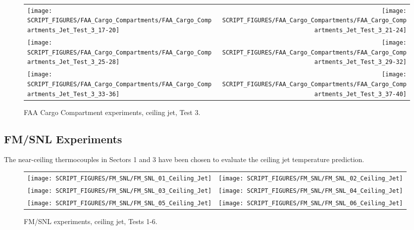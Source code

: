 \begin{figure}[p]
\begin{tabular*}{\textwidth}{l@{\extracolsep{\fill}}r}
\texttt{[image: SCRIPT\_FIGURES/FAA\_Cargo\_Compartments/FAA\_Cargo\_Compartments\_Jet\_Test\_3\_17-20]} &
\texttt{[image: SCRIPT\_FIGURES/FAA\_Cargo\_Compartments/FAA\_Cargo\_Compartments\_Jet\_Test\_3\_21-24]} \\
\texttt{[image: SCRIPT\_FIGURES/FAA\_Cargo\_Compartments/FAA\_Cargo\_Compartments\_Jet\_Test\_3\_25-28]} &
\texttt{[image: SCRIPT\_FIGURES/FAA\_Cargo\_Compartments/FAA\_Cargo\_Compartments\_Jet\_Test\_3\_29-32]} \\
\texttt{[image: SCRIPT\_FIGURES/FAA\_Cargo\_Compartments/FAA\_Cargo\_Compartments\_Jet\_Test\_3\_33-36]} &
\texttt{[image: SCRIPT\_FIGURES/FAA\_Cargo\_Compartments/FAA\_Cargo\_Compartments\_Jet\_Test\_3\_37-40]}
\end{tabular*}
\caption[FAA Cargo Compartment experiments, ceiling jet, Test 3]
{FAA Cargo Compartment experiments, ceiling jet, Test 3.}
\label{FAA_Cargo_HGL_4}
\end{figure}

\clearpage




\subsection{FM/SNL Experiments}

The near-ceiling thermocouples in Sectors 1 and 3 have been chosen to evaluate the ceiling jet temperature prediction.

\begin{figure}[!h]
\begin{tabular*}{\textwidth}{l@{\extracolsep{\fill}}r}
\texttt{[image: SCRIPT\_FIGURES/FM\_SNL/FM\_SNL\_01\_Ceiling\_Jet]} &
\texttt{[image: SCRIPT\_FIGURES/FM\_SNL/FM\_SNL\_02\_Ceiling\_Jet]} \\
\texttt{[image: SCRIPT\_FIGURES/FM\_SNL/FM\_SNL\_03\_Ceiling\_Jet]} &
\texttt{[image: SCRIPT\_FIGURES/FM\_SNL/FM\_SNL\_04\_Ceiling\_Jet]} \\
\texttt{[image: SCRIPT\_FIGURES/FM\_SNL/FM\_SNL\_05\_Ceiling\_Jet]} &
\texttt{[image: SCRIPT\_FIGURES/FM\_SNL/FM\_SNL\_06\_Ceiling\_Jet]} \\
\end{tabular*}
\caption[FM/SNL experiments, ceiling jet, Tests 1-6]
{FM/SNL experiments, ceiling jet, Tests 1-6.}
\label{FM_SNL_Ceiling_Jet_1}
\end{figure}

